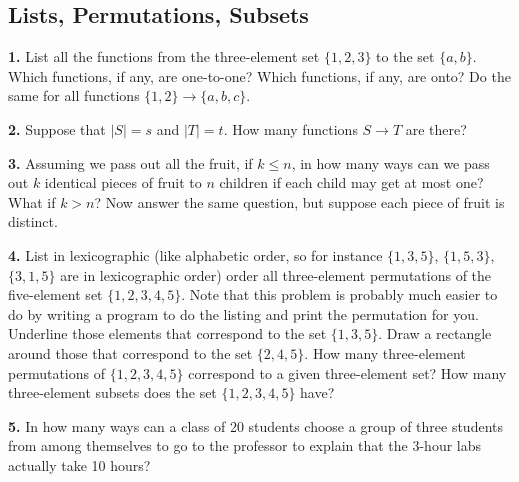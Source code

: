 \documentclass[12pt, letterpaper]{article}
\theoremstyle{definition}
\begin{document}
\subsection*{Lists, Permutations, Subsets}

\vspace*{0.2in}\noindent
\textbf{1.} List all the functions from the three-element set $\{1, 2, 3\}$
to the set $\{a, b\}$. Which functions, if any, are one-to-one? Which functions,
if any, are onto?
Do the same for all functions $\{1, 2\} \to \{a, b, c\}$.

\vspace*{0.3in}\noindent
\textbf{2.} Suppose that $|S| = s$ and $|T| = t$. How many functions $S \to T$
are there?

\vspace*{0.3in}\noindent
\textbf{3.} Assuming we pass out all the fruit, if $k \leq n$, in how many ways
can we pass out $k$ identical pieces of fruit to $n$ children if each child may
get at most one? What if $k > n$?
Now answer the same question, but suppose each piece of fruit is distinct.

\vspace*{0.3in}\noindent
\textbf{4.} List in lexicographic (like alphabetic order, so for instance
$\{1,3,5\}$, $\{1,5,3\}$, $\{3,1,5\}$ are in lexicographic order) order all
three-element permutations of the five-element set $\{1, 2, 3, 4, 5\}$.
Note that this problem is probably much easier to do by writing a program to
do the listing and print the permutation for you.
Underline those elements that correspond to the set $\{1, 3, 5\}$.
Draw a rectangle around those that correspond to the set $\{2, 4, 5\}$.
How many three-element permutations of $\{1, 2, 3, 4, 5\}$ correspond to a
given three-element set? How many three-element subsets does the set
$\{1, 2, 3, 4, 5\}$ have?

\iffalse
    12453
    12534
    13425
    13542
    14235
    14352 +
    15243
    15324 +
    23145
    24315
    25341
    31245
    32415
    32541 -
    41325
    42135
    42351
    51342
    52143 -
    52314

    So there are two of each, there are twenty in this list, so there are 10 3-element subsets.
\fi

\vspace*{0.3in}\noindent
\textbf{5.} In how many ways can a class of 20 students choose a group of three
students from among themselves to go to the professor to explain
that the 3-hour labs actually take 10 hours?
\end{document}
